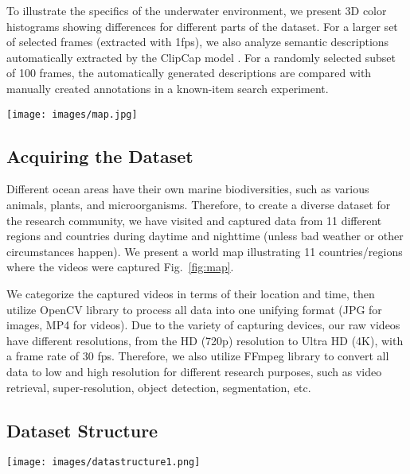 \documentclass[runningheads]{llncs}
\begin{document}
To illustrate the specifics of the underwater environment, we present 3D color histograms showing differences for different parts of the dataset. 
For a larger set of selected frames (extracted with 1fps), we also analyze semantic descriptions automatically extracted by the ClipCap model \cite{mokady2021clipcap}. For a randomly selected subset of 100 frames, the automatically generated descriptions are compared with manually created annotations in a known-item search experiment.


\begin{figure*}
\begin{center}
\centering
\texttt{[image: images/map.jpg]}
\end{center}
  \caption{The world map illustrates countries/regions where we capture data around the world (map source: Google Maps). }
\label{fig:map}
\end{figure*}

\subsection{Acquiring the Dataset}

Different ocean areas have their own marine biodiversities, such as various animals, plants, and microorganisms. Therefore, to create a diverse dataset for the research community, we have visited and captured data from 11 different regions and countries during daytime and nighttime (unless bad weather or other circumstances happen). We present a world map illustrating 11 countries/regions where the videos were captured Fig.~\ref{fig:map}. 

We categorize the captured videos in terms of their location and time, then utilize OpenCV library \cite{opencv_library} to process all data into one unifying format (JPG for images, MP4 for videos). Due to the variety of capturing devices, our raw videos have different resolutions, from the HD (720p) resolution to Ultra HD (4K), with a frame rate of 30 fps. Therefore, we also utilize FFmpeg library\cite{tomar2006converting} to convert all data to low and high resolution for different research purposes, such as video retrieval, super-resolution, object detection, segmentation, etc.


\subsection{Dataset Structure}

\begin{figure*}
\begin{center}
    \centering
    \texttt{[image: images/datastructure1.png]}
\end{center}
    \caption{Directory structure of the Marine Video Kit dataset. }
    \label{fig:datastructure}
\end{figure*}
\end{document}
